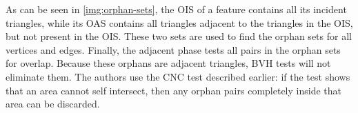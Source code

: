 
As can be seen in \autoref{img:orphan-sets}, the OIS of a feature contains all its incident triangles, while its OAS contains all triangles adjacent to the triangles in the OIS, but not present in the OIS. These two sets are used to find the orphan sets for all vertices and edges. Finally, the adjacent phase tests all pairs in the orphan sets for overlap. Because these orphans are adjacent triangles, BVH tests will not eliminate them. The authors use the CNC test described earlier: if the test shows that an area cannot self intersect, then any orphan pairs completely inside that area can be discarded.


